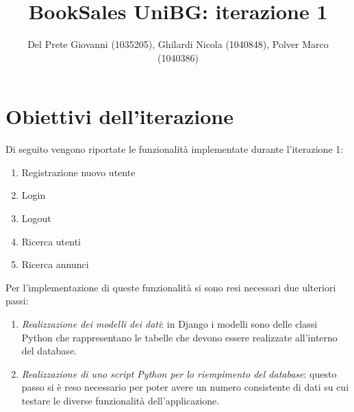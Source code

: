 \documentclass[10pt,a4paper]{article}
\author{Del Prete Giovanni (1035205), Ghilardi Nicola (1040848), Polver Marco (1040386)}
\title{BookSales UniBG: iterazione 1}
\begin{document}
	
	\maketitle
	\tableofcontents
	
	\section{Obiettivi dell'iterazione}
	Di seguito vengono riportate le funzionalità implementate durante l'iterazione 1:
	\begin{enumerate}
		\item Registrazione nuovo utente
		\item Login
		\item Logout
		\item Ricerca utenti
		\item Ricerca annunci
	\end{enumerate}
	Per l'implementazione di queste funzionalità si sono resi necessari due ulteriori passi:
	\begin{enumerate}
		\item \textit{Realizzazione dei modelli dei dati}: in Django i modelli sono delle classi Python che rappresentano le tabelle che devono essere realizzate all'interno del database.
		\item \textit{Realizzazione di uno script Python per lo riempimento del database}: questo passo si è reso necessario per poter avere un numero consistente di dati su cui testare le diverse funzionalità dell'applicazione.
	\end{enumerate}
\end{document}
